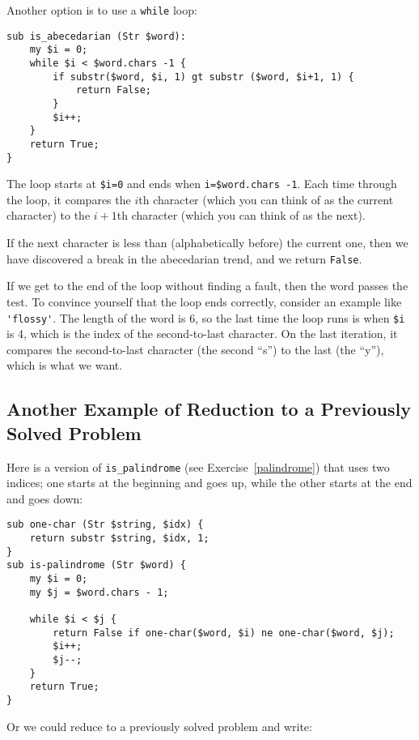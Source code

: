 Another option is to use a {\tt while} loop:

\begin{verbatim}
sub is_abecedarian (Str $word):
    my $i = 0;
    while $i < $word.chars -1 {
        if substr($word, $i, 1) gt substr ($word, $i+1, 1) {
            return False;
        }
        $i++;
    }
    return True;
}
\end{verbatim}
%
The loop starts at {\tt \$i=0} and ends when {\tt i=\$word.chars -1}.  Each
time through the loop, it compares the $i$th character (which you can
think of as the current character) to the $i+1$th character (which you
can think of as the next).

If the next character is less than (alphabetically before) the current
one, then we have discovered a break in the abecedarian trend, and
we return {\tt False}.

If we get to the end of the loop without finding a fault, then the
word passes the test.  To convince yourself that the loop ends
correctly, consider an example like \verb"'flossy'".  The
length of the word is 6, so
the last time the loop runs is when \verb'$i' is 4, which is the
index of the second-to-last character.  On the last iteration,
it compares the second-to-last character (the second ``s'') to 
the last (the ``y''), which is what we want.

\subsection{Another Example of Reduction to a Previously Solved Problem}

\label{palindrome_2}
Here is a version of \verb"is_palindrome" (see
Exercise~\ref{palindrome}) that uses two indices; one starts at the
beginning and goes up, while the other starts at the end and goes down:		

\begin{verbatim}
sub one-char (Str $string, $idx) {
    return substr $string, $idx, 1;
}
sub is-palindrome (Str $word) {
    my $i = 0;
    my $j = $word.chars - 1;

    while $i < $j {
        return False if one-char($word, $i) ne one-char($word, $j);
        $i++;
        $j--;
    }
    return True;
}
\end{verbatim}

Or we could reduce to a previously solved
problem and write:

